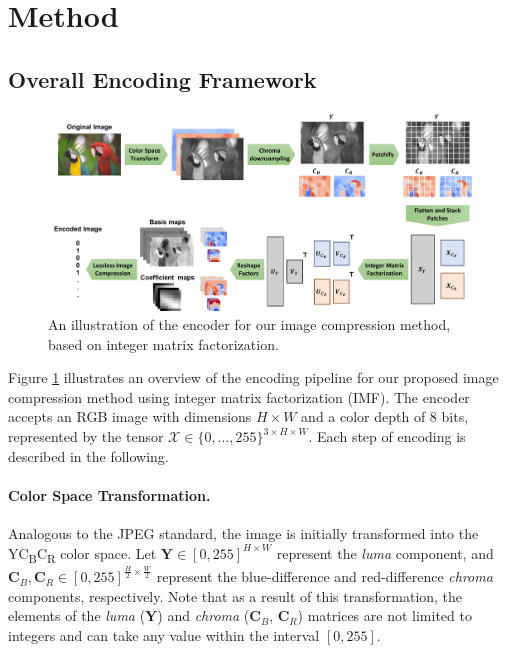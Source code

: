 \section{Method} \label{sec: method}


\subsection{Overall Encoding Framework} \label{sec: overall encoding framework}

\begin{figure}[t]
	\centering
	\includegraphics[width=\linewidth]{figures/imf_encoder.pdf}
	\vspace{10pt}
	\caption{An illustration of the encoder for our image compression method, based on integer matrix factorization.}
	\label{fig:imf_encoder}
\end{figure}

Figure \ref{fig:imf_encoder} illustrates an overview of the encoding pipeline for our proposed image compression method using integer matrix factorization (IMF). The encoder accepts an RGB image with dimensions $H \times W$ and a color depth of 8 bits, represented by the tensor $\bm{\mathcal{X}} \in \{0, \ldots, 255\}^{3 \times H \times W}$. Each step of encoding is described in the following.

\paragraph{Color Space Transformation.}
Analogous to the JPEG standard, the image is initially transformed into the YC\textsubscript{B}C\textsubscript{R} color space. Let $\bm{Y} \in [0, 255]^{H \times W}$ represent the \emph{luma} component, and $\bm{C}_B, \bm{C}_R \in [0, 255]^{\frac{H}{2} \times \frac{W}{2}}$ represent the blue-difference and red-difference \emph{chroma} components, respectively. Note that as a result of this transformation, the elements of the \emph{luma} ($\bm{Y}$) and \emph{chroma} ($\bm{C}_B$, $\bm{C}_R$) matrices are not limited to integers and can take any value within the interval $[0, 255]$.

